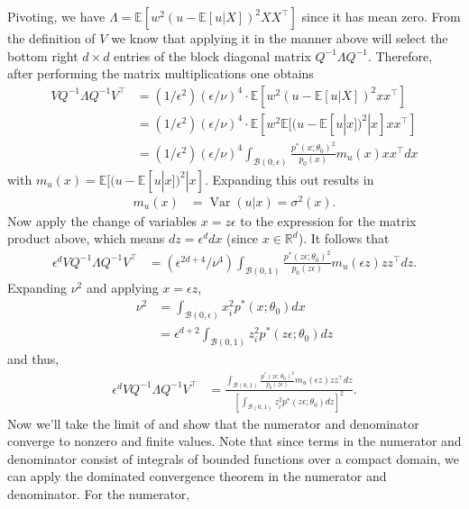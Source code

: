 \documentclass[11pt]{article}
\begin{document}
Pivoting, we have $\Lambda = \mathbb{E}[w^2(u - \mathbb{E}[u|X])^2XX^{\top}]$ since it has mean zero. From the definition of $V$ we know that applying it in the manner above will select the bottom right $d\times d$ entries of the block diagonal matrix $Q^{-1}\Lambda Q^{-1}$. Therefore, after performing the matrix multiplications one obtains
\begin{align*}
    VQ^{-1}\Lambda Q^{-1}V^{\top}&= (1/\epsilon^2)(\epsilon/\nu)^{4} \cdot \mathbb{E}\left[w^2(u - \mathbb{E}[u|X])^2xx^{\top}\right] \\
    &= (1/\epsilon^2)(\epsilon/\nu)^{4} \cdot \mathbb{E}\left[w^2\mathbb{E}[(u - \mathbb{E}[u|x])^2|x]xx^{\top}\right]\\
    &= (1/\epsilon^2)(\epsilon/\nu)^{4}\int_{\mathcal{B}(0, \epsilon)} \frac{p^*(x; \theta_0)^2}{p_0(x)}m_u(x)xx^{\top} dx
\end{align*}
with $m_u(x) = \mathbb{E}[(u - \mathbb{E}[u|x])^2|x]$. Expanding this out results in
\begin{align*}
    m_u(x) &= \operatorname{Var}(u|x) = \sigma^2(x).
\end{align*}
Now apply the change of variables $x = z\epsilon$ to the expression for the matrix product above, which means $dz = \epsilon^ddx$ (since $x \in \mathbb{R}^d$). It follows that
\begin{align*}
    \epsilon^dVQ^{-1}\Lambda Q^{-1}V^{\top} &= (\epsilon^{2d+4}/\nu^{4})\int_{\mathcal{B}(0, 1)} \frac{p^*(z\epsilon; \theta_0)^2}{p_0(z\epsilon)}m_u(\epsilon z)zz^{\top} dz.
\end{align*}
Expanding $\nu^2$ and applying $x = \epsilon z$,
\begin{align*}
    \nu^2 &= \int_{\mathcal{B}(0, \epsilon)}x_i^2 p^*(x; \theta_0)dx \\
    &= \epsilon^{d+2} \int_{\mathcal{B}(0, 1)}z_i^2p^*(z\epsilon; \theta_0) dz
\end{align*}
and thus,
\begin{align}
    \epsilon^dVQ^{-1}\Lambda Q^{-1}V^{\top} &= \frac{\int_{\mathcal{B}(0, 1)} \frac{p^*(z\epsilon; \theta_0)^2}{p_0(z\epsilon)}m_u(\epsilon z)zz^{\top} dz}{\left[\int_{\mathcal{B}(0, 1)}z_i^2p^*(z\epsilon; \theta_0) dz\right]^2}. \label{eq: asymp var intermediate}
\end{align}
Now we'll take the limit of  and show that the numerator and denominator converge to nonzero and finite values. Note that since terms in the numerator and denominator consist of integrals of bounded functions over a compact domain, we can apply the dominated convergence theorem in the numerator and denominator. For the numerator,
\end{document}
